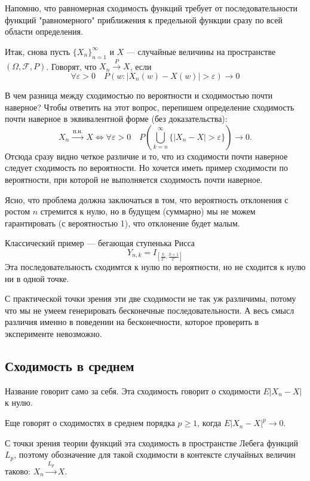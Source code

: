 \documentclass[a4paper,12pt]{article}
\newcommand{\ep}{\varepsilon}
\newcommand{\braces}[1]{\left(#1\right)}
\newcommand{\myarrow}[1]{\xrightarrow{\ #1\ }}
\newcounter{th-counter}
\begin{document}
Напомню, что равномерная сходимость функций требует от последовательности функций "равномерного" приближения к предельной функции сразу по всей области определения.

Итак, снова пусть $\{X_n\}_{n=1}^\infty$ и $X$ --- случайные величины на пространстве $(\Omega, \mathcal{F}, P)$. Говорят, что $X_n \myarrow{P} X$, если
$$\forall \ep>0 \quad P(w: |X_n(w)-X(w)| > \ep) \rightarrow 0$$

В чем разница между сходимостью по вероятности и сходимостью почти наверное? Чтобы ответить на этот вопрос, перепишем определение сходимость почти наверное в эквивалентной форме (без доказательства):
$$X_n \myarrow{\text{п.н.}} X \Leftrightarrow \forall \ep > 0 \quad P\braces{\bigcup_{k=n}^\infty \{|X_n - X| > \ep\}} \rightarrow 0.$$
Отсюда сразу видно четкое различие и то, что из сходимости почти наверное следует сходимость по вероятности. Но хочется иметь пример сходимости по вероятности, при которой не выполняется сходимость почти наверное.

Ясно, что проблема должна заключаться в том, что вероятность отклонения с ростом $n$ стремится к нулю, но в будущем (суммарно) мы не можем гарантировать (с вероятностью 1), что отклонение будет малым.

Классический пример --- бегающая ступенька Рисса
$$Y_{n,k} = I_{\left[ \frac{k}{2^n}, \frac{k+1}{2^n}\right]}$$
Эта последовательность сходимтся к нулю по вероятности, но не сходится к нулю ни в одной точке.

С практической точки зрения эти две сходимости не так уж различимы, потому что мы не умеем генерировать бесконечные последовательности. А весь смысл различия именно в поведении на бесконечности, которое проверить в эксперименте невозможно.

\subsection*{Сходимость в среднем} 

Название говорит само за себя. Эта сходимость говорит о сходимости $E|X_n-X|$ к нулю.

Еще говорят о сходимостях в среднем порядка $p \geq 1$, когда $E|X_n-X|^p \rightarrow 0$.

С точки зрения теории функций эта сходимость в пространстве Лебега функций $L_p$, поэтому обозначение для такой сходимости в контексте случайных величин таково: $X_n \myarrow{L_p} X$.
\end{document}
